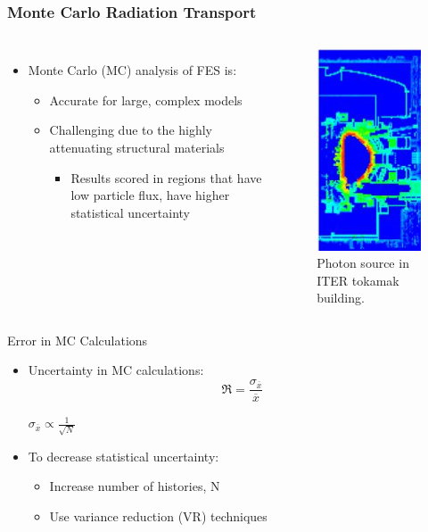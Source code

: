 \documentclass{beamer}
\begin{document}
\begin{frame}
\frametitle{Monte Carlo Radiation Transport}
\begin{columns}
\begin{itemize}
	\item{Monte Carlo (MC) analysis of FES is:}
	\begin{itemize}
		\item{Accurate for large, complex models}
		\item{Challenging due to the highly attenuating structural materials}
                  \begin{itemize}
                  \item{Results scored in regions that have low particle flux, have higher statistical uncertainty}
                  \end{itemize}
	\end{itemize}
\end{itemize}

\begin{figure}
	\centering
	\includegraphics[scale=0.5]{iter_pflux.jpg}
	\caption{Photon source in ITER tokamak building.}
\end{figure}

\end{columns}
\end{frame}

\begin{frame}{Error in MC Calculations}
\begin{itemize}
\item{Uncertainty in MC calculations:}
\begin{equation} \label{eq:1.2}
		\Re = \frac{\sigma_{\overline{x}}}{{\overline{x}}}
\end{equation}
		\begin{center}
		{$\sigma_{\overline{x}} \propto \frac{1}{\sqrt{N}}$}%
		\end{center}
\item{To decrease statistical uncertainty:}
  \begin{itemize}
  \item{Increase number of histories, N}
  \item{Use variance reduction (VR) techniques}
  \end{itemize}
\end{itemize}
\end{frame}
\end{document}
